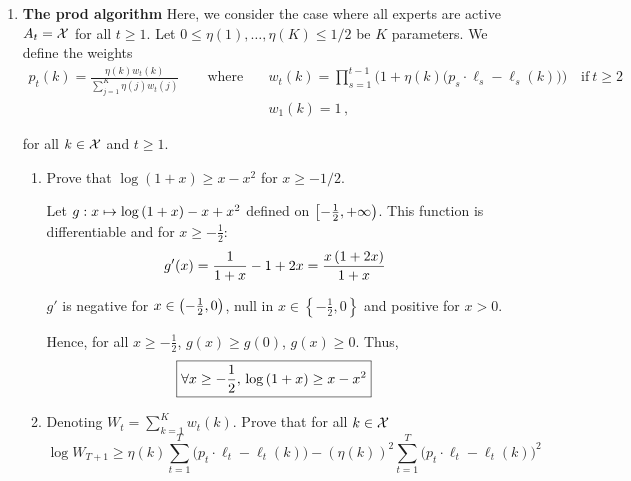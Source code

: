 \begin{enumerate}[resume]
	\item
	{\bfseries The prod algorithm}
	Here, we consider the case where all experts are active $A_t = \mathcal{X}$ for all $t \geq 1$. Let $0\leq \eta(1),\dots,\eta(K)\leq 1/2$ be $K$ parameters. We define the weights 
		\begin{equation}
		    \begin{aligned}
			p_t(k) = \frac{\eta(k) w_t(k)}{\sum_{j=1}^K \eta(j) w_t(j)} \qquad \text{where} \quad &w_t(k) = \prod_{s=1}^{t-1}\Big(1+\eta(k)\big(p_s \cdot \ell_s - \ell_s(k)\big)\Big)\quad \text{if}\  t\geq2\quad \\
			&w_1(k) = 1\,,
			\end{aligned}
			\label{eq:prod}
			\tag{$*$}
		\end{equation}
		
	for all $k \in \mathcal{X}$ and $t \geq 1$.
	\begin{enumerate}[label=(\alph*)]
		\item Prove that $\log(1+x) \geq x - x^2$ for $x \geq -1/2$.
		
        \begin{solution}
        Let $g: x \mapsto \log \left( 1 + x \right) - x + x^2$ defined on $\left[ - \frac{1}{2}, + \infty \right)$. This function is differentiable and for $x \geq - \frac{1}{2}$:
        \begin{equation*}
            g'(x) = \frac{1}{1 + x} - 1 + 2x = \frac{x \left( 1 + 2x \right)}{1 + x}
        \end{equation*}
        
        $g'$ is negative for $x \in \left( - \frac{1}{2}, 0 \right)$, null in $x \in \left\{ - \frac{1}{2}, 0 \right\}$ and positive for $x > 0$. 
        
        Hence, for all $x \geq - \frac{1}{2}$, $g(x) \geq g(0)$, \ie $g(x) \geq 0$. Thus,
        \begin{equation*}
            \boxed{\forall x \geq - \frac{1}{2},\, \log \left( 1 + x \right) \geq x - x^2}
        \end{equation*}
        \end{solution}

		\item Denoting $W_{t} = \sum_{k=1}^K w_t(k)$. Prove that for all $k \in \mathcal{X}$
		\begin{equation*}
			\log W_{T+1} \geq \eta(k) \sum_{t=1}^T \big(p_t \cdot \ell_t - \ell_t(k)\big) - (\eta(k))^2 \sum_{t=1}^T \big(p_t \cdot \ell_t  - \ell_t(k)\big)^2
		\end{equation*}


\end{enumerate}
\end{enumerate}
